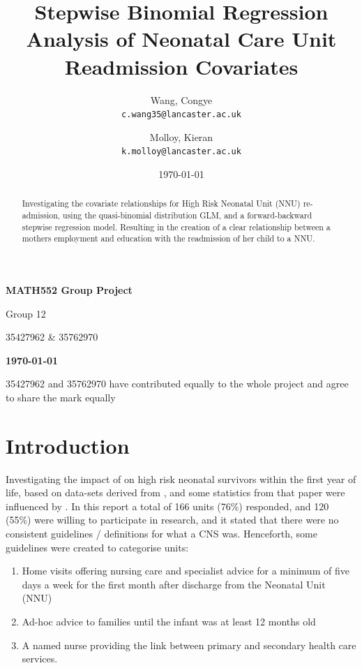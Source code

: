\documentclass[11pt]{article}
\title{Stepwise Binomial Regression Analysis of Neonatal Care Unit Readmission Covariates}
\author{
  Wang, Congye\\
  \texttt{c.wang35@lancaster.ac.uk}
  \and
  Molloy, Kieran\\
  \texttt{k.molloy@lancaster.ac.uk}
}
\date{\today}
\begin{document}
\thispagestyle{plain}
\begin{center}
    \Large
    \textbf{MATH552 Group Project}
        
    \vspace{0.4cm}
    \large
    Group 12
        
    \vspace{0.4cm}
    35427962 \& 35762970
       
    \vspace{0.9cm}
    \textbf{\today}
    
    \vspace{0.9cm}
    35427962 and 35762970 have contributed equally to the whole project and agree to share the mark equally
    \end{center}

\maketitle

\begin{abstract}\label{sec:abstract}
Investigating the covariate relationships for High Risk Neonatal Unit (NNU) re-admission, using the quasi-binomial distribution GLM, and a forward-backward stepwise regression model. Resulting in the creation of a clear relationship between a mothers employment and education with the readmission of her child to a NNU.
\end{abstract}

\section{Introduction}\label{sec:intro}
Investigating the impact of  on high risk neonatal survivors within the first year of life, based on data-sets derived from \cite{langley2002impact}, and some statistics from that paper were influenced by \cite{mugford2001}. In this report a total of 166 units (76\%) responded, and 120 (55\%) were willing to participate in research, and it stated that there were no consistent guidelines / definitions for what a CNS was. Henceforth, some guidelines were created to categorise units:
\begin{enumerate}\label{enum:CNS-types}
    \item Home visits offering nursing care and specialist advice for a minimum of five days a week for the first month after discharge from the Neonatal Unit (NNU)
    \item Ad-hoc advice to families until the infant was at least 12 months old
    \item A named nurse providing the link between primary and secondary health care services.
\end{enumerate}
\end{document}
